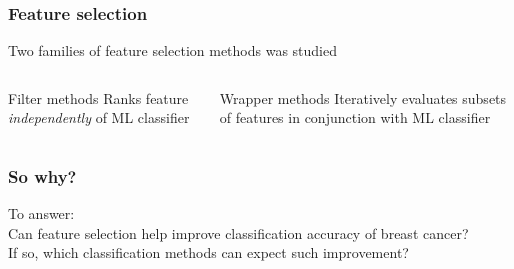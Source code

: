 \documentclass[aspectratio=1610]{beamer}
\begin{document}
\begin{frame}
  \frametitle{\hfill Feature selection}
  Two families of feature selection methods was studied\pause
  \begin{columns}[T]
    \begin{column}{.5\textwidth}
      \begin{block}{Filter methods}
        Ranks feature \textit{independently} of ML classifier
      \end{block}
    \end{column}
    \begin{column}{.5\textwidth}
      \begin{block}{Wrapper methods}
        Iteratively evaluates subsets of features in conjunction with ML classifier
      \end{block}
    \end{column}
  \end{columns}
\end{frame}

\begin{frame}
  \frametitle{\hfill So why?}
  To answer:\\
  \vspace{0.05\textheight}
  Can feature selection help improve classification accuracy of breast cancer?\\
  \vspace{0.05\textheight}
  If so, which classification methods can expect such improvement?\\
\end{frame}

\end{document}
